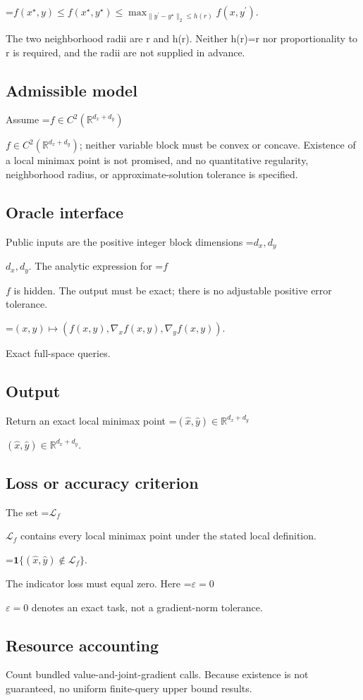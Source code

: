 \documentclass[10pt,a4paper]{article}
\newcommand{\AtlasMath}[1]{\par\begingroup\centering\setbox0=\hbox{$\displaystyle #1$}\ifdim\wd0>1.4\linewidth\typeout{ATLAS WIDE FORMULA: \the\wd0}\fi\ifdim\wd0>\linewidth\resizebox{\linewidth}{!}{\box0}\else\box0\fi\par\endgroup}
\newcommand{\AtlasInlineMath}[1]{\begingroup\setbox0=\hbox{$#1$}\ifdim\wd0>.4\linewidth\endgroup\AtlasMath{#1}\else\endgroup$#1$\fi}
\begin{document}
\AtlasMath{f(x^\star,y)\le f(x^\star,y^\star)\le\max_{\|y^\prime-y^\star\|_2\le h(r)} f(x,y^\prime).}


The two neighborhood radii are r and h(r). Neither h(r)=r nor proportionality to r is required, and the radii are not supplied in advance.

\subsection{Admissible model}
Assume \AtlasInlineMath{f\in C^2(\mathbb{R}^{d_x+d_y})}; neither variable block must be convex or concave. Existence of a local minimax point is not promised, and no quantitative regularity, neighborhood radius, or approximate-solution tolerance is specified.

\subsection{Oracle interface}
Public inputs are the positive integer block dimensions \AtlasInlineMath{d_x,d_y}. The analytic expression for \AtlasInlineMath{f} is hidden. The output must be exact; there is no adjustable positive error tolerance.


\AtlasMath{(x,y)\longmapsto(f(x,y),\nabla_x f(x,y),\nabla_y f(x,y)).}


Exact full-space queries.

\subsection{Output}
Return an exact local minimax point \AtlasInlineMath{(\widehat x,\widehat y)\in\mathbb R^{d_x+d_y}}.

\subsection{Loss or accuracy criterion}
The set \AtlasInlineMath{\mathcal L_f} contains every local minimax point under the stated local definition.


\AtlasMath{\mathbf 1\{(\widehat x,\widehat y)\notin\mathcal L_f\}.}


The indicator loss must equal zero. Here \AtlasInlineMath{\varepsilon=0} denotes an exact task, not a gradient-norm tolerance.

\subsection{Resource accounting}
Count bundled value-and-joint-gradient calls. Because existence is not guaranteed, no uniform finite-query upper bound results.
\end{document}
